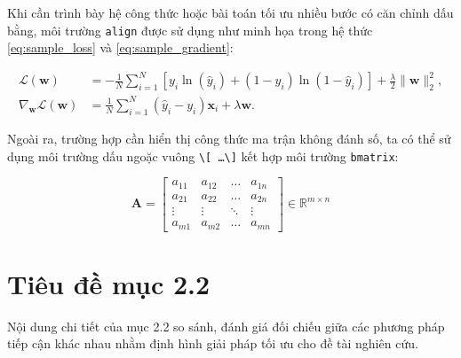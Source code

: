 Khi cần trình bày hệ công thức hoặc bài toán tối ưu nhiều bước có căn chỉnh dấu bằng, môi trường \texttt{align} được sử dụng như minh họa trong hệ thức \eqref{eq:sample_loss} và \eqref{eq:sample_gradient}:

\begin{align}
    \label{eq:sample_loss}
    \mathcal{L}(\mathbf{w}) &= -\frac{1}{N} \sum_{i=1}^{N} \left[ y_i \ln(\hat{y}_i) + (1 - y_i)\ln(1 - \hat{y}_i) \right] + \frac{\lambda}{2} \|\mathbf{w}\|_2^2, \\
    \label{eq:sample_gradient}
    \nabla_{\mathbf{w}} \mathcal{L}(\mathbf{w}) &= \frac{1}{N} \sum_{i=1}^{N} (\hat{y}_i - y_i) \mathbf{x}_i + \lambda \mathbf{w}.
\end{align}

Ngoài ra, trường hợp cần hiển thị công thức ma trận không đánh số, ta có thể sử dụng môi trường dấu ngoặc vuông \texttt{\textbackslash[ \dots \textbackslash]} kết hợp môi trường \texttt{bmatrix}:

\[
    \mathbf{A} = \begin{bmatrix}
        a_{11} & a_{12} & \dots  & a_{1n} \\
        a_{21} & a_{22} & \dots  & a_{2n} \\
        \vdots & \vdots & \ddots & \vdots \\
        a_{m1} & a_{m2} & \dots  & a_{mn}
    \end{bmatrix} \in \mathbb{R}^{m \times n}
\]

\section{Tiêu đề mục 2.2}
\label{sec:section_2_2}

Nội dung chi tiết của mục 2.2 so sánh, đánh giá đối chiếu giữa các phương pháp tiếp cận khác nhau nhằm định hình giải pháp tối ưu cho đề tài nghiên cứu.
